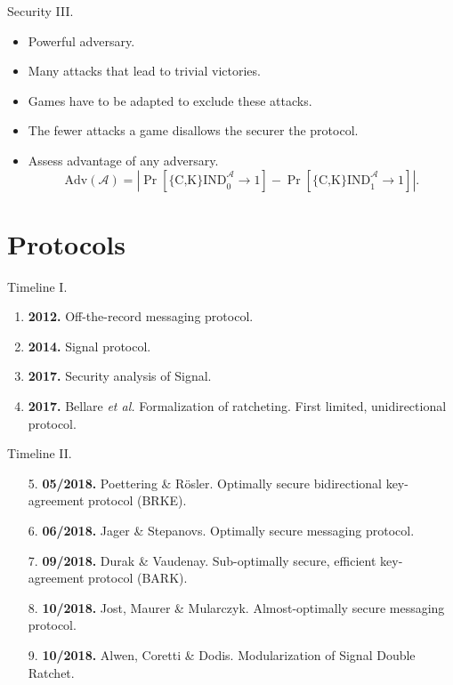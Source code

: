 \documentclass{beamer}
\renewcommand{\t}{\text}
\begin{document}
\begin{frame}{Security III.}
  \begin{itemize}
  \item Powerful adversary.
  \item Many attacks that lead to trivial victories.
  \item Games have to be adapted to exclude these attacks.
  \item The fewer attacks a game disallows the securer the protocol.
  \item Assess advantage of any adversary.
\[
  \t{Adv}(\mathcal{A}) = \left| \Pr \left[ \t{\{C,K\}IND}_0^\mathcal{A} \rightarrow 1 \right] -
                                \Pr \left[ \t{\{C,K\}IND}_1^\mathcal{A} \rightarrow 1 \right]
                         \right|.
\]
  \end{itemize}
\end{frame}

\section{Protocols}
\label{sec:protocols}

\begin{frame}{Timeline I.}
  \begin{enumerate}
  \item \textbf{2012.} Off-the-record messaging protocol.
  \item \textbf{2014.} Signal protocol.
  \item \textbf{2017.} Security analysis of Signal.
  \item \textbf{2017.} Bellare {\em et al.} Formalization of ratcheting. First
    limited, unidirectional protocol.
  \end{enumerate}
\end{frame}

\begin{frame}{Timeline II.}
  \begin{enumerate}
  \item[5.] \textbf{05/2018.} Poettering \& Rösler. Optimally secure bidirectional
    key-agreement protocol (BRKE).
  \item[6.] \textbf{06/2018.} Jager \& Stepanovs. Optimally secure messaging protocol.
  \item[7.] \textbf{09/2018.} Durak \& Vaudenay. Sub-optimally secure, efficient key-agreement
    protocol (BARK).
  \item[8.] \textbf{10/2018.} Jost, Maurer \& Mularczyk. Almost-optimally secure messaging
    protocol.
  \item[9.] \textbf{10/2018.} Alwen, Coretti \& Dodis. Modularization of Signal Double
    Ratchet.
  \end{enumerate}
\end{frame}
\end{document}
